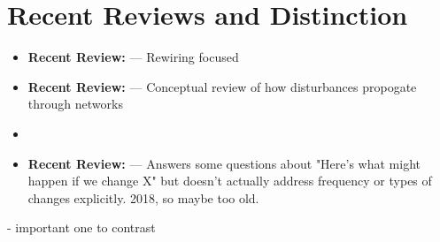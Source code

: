 \documentclass[12pt]{article}
\begin{document}
\section*{Recent Reviews and Distinction}
\begin{itemize}[leftmargin=1.5em]
    \item \textbf{Recent Review:} \cite{fuzessy2024navigating} — Rewiring focused
    \item \textbf{Recent Review:} \cite{martins2024propagation} — Conceptual review of how disturbances propogate through networks
    \item \cite{parra2021impacts}
    \item \textbf{Recent Review:} \cite{landi2018complexity} — Answers some questions about "Here's what might happen if we change X" but doesn't actually address frequency or types of changes explicitly. 2018, so maybe too old. 
\end{itemize}
    \item \cite{vidal2021variable}
    \item \cite{teixido2022anthropogenic} - important one to contrast
 
 
\end{document}
